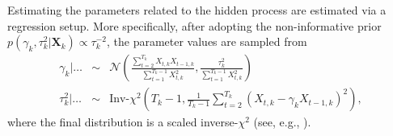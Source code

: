 \documentclass[aoas, preprint]{imsart}
\numberwithin{equation}{section}
\theoremstyle{plain}
\begin{document}
\begin{center}
\end{center}
Estimating the parameters related to the hidden process are estimated via a regression setup. More specifically, after adopting the non-informative prior $p(\gamma_k, \tau_k^2 | \boldsymbol{X}_k) \propto \tau_k^{-2}$, the parameter values are sampled from
\begin{eqnarray*}
\gamma_k | \dots  &\sim&  \mathcal{N} \left( \frac{\sum_{t=2}^{T_k} X_{t,k}X_{t-1,k}}{\sum_{t=1}^{T_k-1} X_{t,k}^2} , \frac{\tau_k^2}{\sum_{t=1}^{T_k-1} X_{t,k}^2} \right)\\
\tau_k^2 | \dots &\sim& \text{Inv-}\chi^2 \left(T_k-1, \frac{1}{T_k-1} \sum_{t=2}^{T_k} \left(X_{t,k} - \gamma_k X_{t-1,k} \right)^2 \right),
\end{eqnarray*}
where the final distribution is a scaled inverse-$\chi^2$ (see, e.g., \citet{gelman2003bayesian}).



\end{document}
